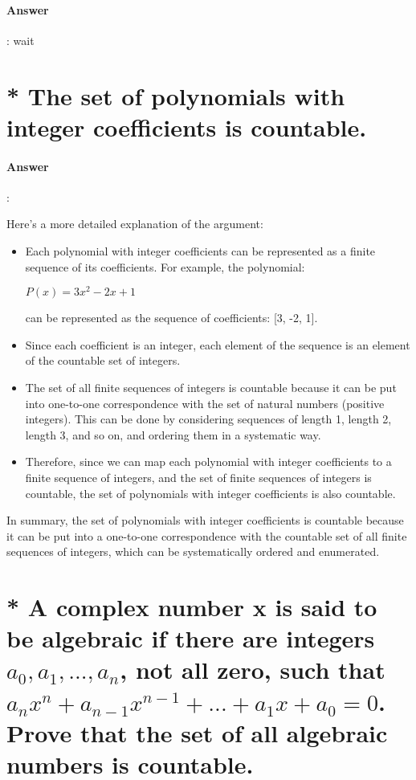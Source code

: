 \documentclass{article}
\begin{document}
\paragraph{Answer}:
wait

\section{* The set of polynomials with integer coeﬀicients is countable.}

\paragraph{Answer}:

Here's a more detailed explanation of the argument:

\begin{itemize}
  \item Each polynomial with integer coefficients can be represented as a finite sequence of its coefficients. For example, the polynomial:

  $P(x) = 3x^2 - 2x + 1$
  
  can be represented as the sequence of coefficients: [3, -2, 1].
  
  \item Since each coefficient is an integer, each element of the sequence is an element of the countable set of integers.
  
  \item The set of all finite sequences of integers is countable because it can be put into one-to-one correspondence with the set of natural numbers (positive integers). This can be done by considering sequences of length 1, length 2, length 3, and so on, and ordering them in a systematic way.
  
  \item Therefore, since we can map each polynomial with integer coefficients to a finite sequence of integers, and the set of finite sequences of integers is countable, the set of polynomials with integer coefficients is also countable.
\end{itemize}

In summary, the set of polynomials with integer coefficients is countable because it can be put into a one-to-one correspondence with the countable set of all finite sequences of integers, which can be systematically ordered and enumerated.

\section{* A complex number x is said to be algebraic if there are integers $a_0, a_1, . . ., a_n$, not all zero, such that $a_nx^n + a_{n-1}x^{n-1} + ... + a_1x + a_0 = 0$. Prove that the set of all algebraic numbers is countable.}
\end{document}
